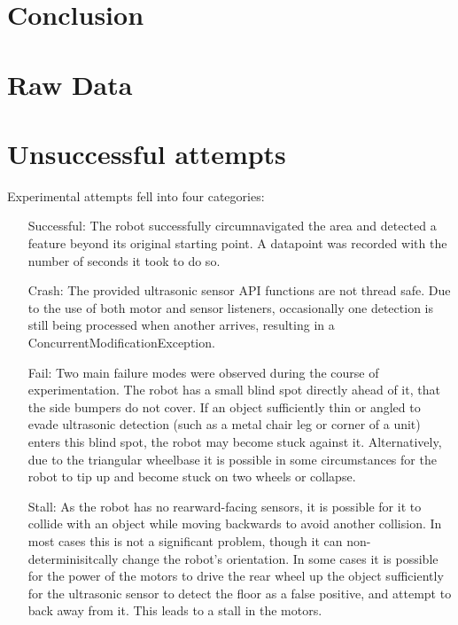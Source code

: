 \documentclass[a4paper,12pt]{article}
\begin{document}
\section{Conclusion}




\Appendix
\section{Raw Data}\label{app:data}

\section{Unsuccessful attempts}\label{app:fail}
Experimental attempts fell into four categories:
\begin{enumerate}
	\item [Successful:] The robot successfully circumnavigated the area and detected a feature beyond its original starting point. A datapoint was recorded with the number of seconds it took to do so.
	\item [Crash:] The provided ultrasonic sensor API functions are not thread safe. Due to the use of both motor and sensor listeners, occasionally one detection is still being processed when another arrives, resulting in a ConcurrentModificationException.
	\item [Fail:] Two main failure modes were observed during the course of experimentation. The robot has a small blind spot directly ahead of it, that the side bumpers do not cover. If an object sufficiently thin or angled to evade ultrasonic detection (such as a metal chair leg or corner of a unit) enters this blind spot, the robot may become stuck against it. Alternatively, due to the triangular wheelbase it is possible in some circumstances for the robot to tip up and become stuck on two wheels or collapse.
	\item [Stall:] As the robot has no rearward-facing sensors, it is possible for it to collide with an object while moving backwards to avoid another collision. In most cases this is not a significant problem, though it can non-determinisitcally change the robot's orientation. In some cases it is possible for the power of the motors to drive the rear wheel up the object sufficiently for the ultrasonic sensor to detect the floor as a false positive, and attempt to back away from it. This leads to a stall in the motors.
\end{enumerate}

\end{document}
